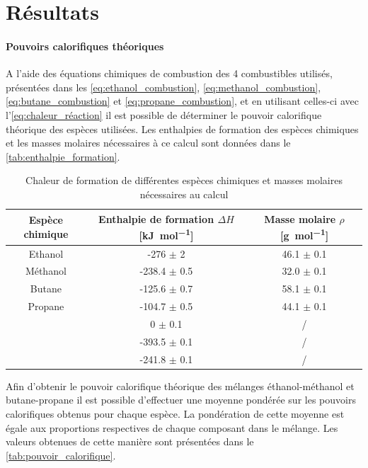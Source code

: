 \section{Résultats}

\paragraph*{Pouvoirs calorifiques théoriques}
A l'aide des équations chimiques de combustion des 4 combustibles utilisés, présentées dans les \autoref{eq:ethanol_combustion}, \autoref{eq:methanol_combustion}, \autoref{eq:butane_combustion} et \autoref{eq:propane_combustion}, et en utilisant celles-ci avec l'\autoref{eq:chaleur_réaction} il est possible de déterminer le pouvoir calorifique théorique des espèces utilisées. Les enthalpies de formation des espèces chimiques et les masses molaires nécessaires à ce calcul sont données dans le \autoref{tab:enthalpie_formation}.

\begin{table}[h]
    \centering
    \begin{tabulary}{\linewidth}{C C C}
        \toprule
        Espèce chimique & Enthalpie de formation \(\Delta H\) [\si{\kilo\joule\per\mole}] & Masse molaire \(\rho\) [\si{\gram\per\mole}]\\
        \midrule
        Ethanol & -276 \(\pm\) 2 & 46.1 \(\pm\) 0.1 \\
        Méthanol & -238.4 \(\pm\) 0.5 & 32.0 \(\pm\) 0.1 \\
        Butane & -125.6 \(\pm\) 0.7 & 58.1 \(\pm\) 0.1\\
        Propane & -104.7 \(\pm\) 0.5 & 44.1 \(\pm\) 0.1\\
         & 0 \(\pm\) 0.1 & / \\
         & -393.5 \(\pm\) 0.1 & / \\
         & -241.8 \(\pm\) 0.1 & / \\
        \bottomrule
    \end{tabulary}
    \caption{Chaleur de formation de différentes espèces chimiques et masses molaires nécessaires au calcul \cite{notice} \cite{NIST}}
    \label{tab:enthalpie_formation}
\end{table}

Afin d'obtenir le pouvoir calorifique théorique des mélanges éthanol-méthanol et butane-propane il est possible d'effectuer une moyenne pondérée sur les pouvoirs calorifiques obtenus pour chaque espèce. La pondération de cette moyenne est égale aux proportions respectives de chaque composant dans le mélange. Les valeurs obtenues de cette manière sont présentées dans le \autoref{tab:pouvoir_calorifique}.



